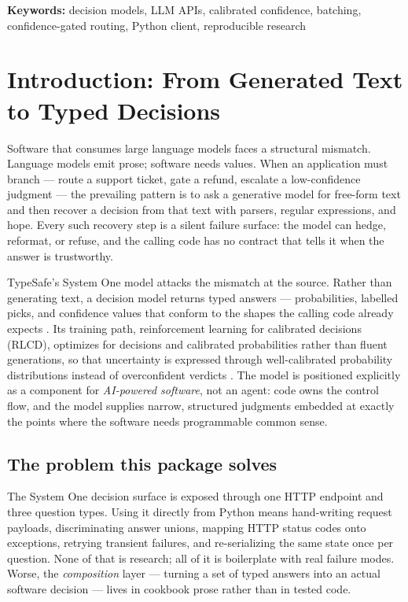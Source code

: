 \documentclass[
  english,
]{article}
\begin{document}
\textbf{Keywords:} decision models, LLM APIs, calibrated confidence,
batching, confidence-gated routing, Python client, reproducible research

\newpage

\section{Introduction: From Generated Text to Typed
Decisions}\label{sec:introduction}

Software that consumes large language models faces a structural
mismatch. Language models emit prose; software needs values. When an
application must branch --- route a support ticket, gate a refund,
escalate a low-confidence judgment --- the prevailing pattern is to ask
a generative model for free-form text and then recover a decision from
that text with parsers, regular expressions, and hope. Every such
recovery step is a silent failure surface: the model can hedge,
reformat, or refuse, and the calling code has no contract that tells it
when the answer is trustworthy.

TypeSafe's System One model attacks the mismatch at the source. Rather
than generating text, a decision model returns typed answers ---
probabilities, labelled picks, and confidence values that conform to the
shapes the calling code already expects \citep{typesafe2026systemone}.
Its training path, reinforcement learning for calibrated decisions
(RLCD), optimizes for decisions and calibrated probabilities rather than
fluent generations, so that uncertainty is expressed through
well-calibrated probability distributions instead of overconfident
verdicts \citep{typesafe2026systemoneconcept}. The model is positioned
explicitly as a component for \emph{AI-powered software}, not an agent:
code owns the control flow, and the model supplies narrow, structured
judgments embedded at exactly the points where the software needs
programmable common sense.

\subsection{The problem this package
solves}\label{the-problem-this-package-solves}

The System One decision surface is exposed through one HTTP endpoint and
three question types. Using it directly from Python means hand-writing
request payloads, discriminating answer unions, mapping HTTP status
codes onto exceptions, retrying transient failures, and re-serializing
the same state once per question. None of that is research; all of it is
boilerplate with real failure modes. Worse, the \emph{composition} layer
--- turning a set of typed answers into an actual software decision ---
lives in cookbook prose rather than in tested code.
\end{document}
